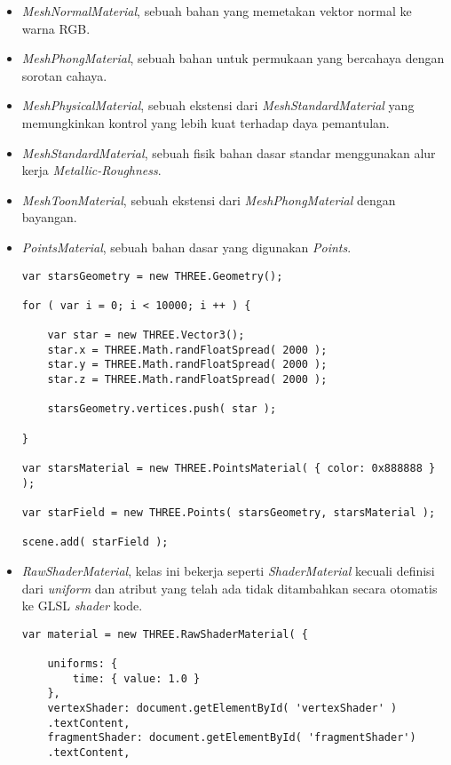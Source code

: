 \begin{itemize}
\begin{itemize}
	\item {\it MeshNormalMaterial}, sebuah bahan yang memetakan vektor normal ke warna RGB.
	
	\item {\it MeshPhongMaterial}, sebuah bahan untuk permukaan yang bercahaya dengan sorotan cahaya.
	
	\item {\it MeshPhysicalMaterial}, sebuah ekstensi dari {\it MeshStandardMaterial} yang memungkinkan kontrol yang lebih kuat terhadap daya pemantulan.
	
	\item {\it MeshStandardMaterial}, sebuah fisik bahan dasar standar menggunakan alur kerja {\it Metallic-Roughness}.
	
	\item {\it MeshToonMaterial}, sebuah ekstensi dari {\it MeshPhongMaterial} dengan bayangan.
	
	\item {\it PointsMaterial}, sebuah bahan dasar yang digunakan {\it Points}.
	
\begin{lstlisting}
var starsGeometry = new THREE.Geometry();

for ( var i = 0; i < 10000; i ++ ) {

	var star = new THREE.Vector3();
	star.x = THREE.Math.randFloatSpread( 2000 );
	star.y = THREE.Math.randFloatSpread( 2000 );
	star.z = THREE.Math.randFloatSpread( 2000 );

	starsGeometry.vertices.push( star );

}

var starsMaterial = new THREE.PointsMaterial( { color: 0x888888 } );

var starField = new THREE.Points( starsGeometry, starsMaterial );

scene.add( starField );
\end{lstlisting}

	\item {\it RawShaderMaterial}, kelas ini bekerja seperti {\it ShaderMaterial} kecuali definisi dari {\it uniform} dan atribut yang telah ada tidak ditambahkan secara otomatis ke GLSL {\it shader} kode.
	
\begin{lstlisting}
var material = new THREE.RawShaderMaterial( {

    uniforms: {
        time: { value: 1.0 }
    },
    vertexShader: document.getElementById( 'vertexShader' )
    .textContent,
    fragmentShader: document.getElementById( 'fragmentShader')
    .textContent,


\end{lstlisting}
\end{itemize}
\end{itemize}
